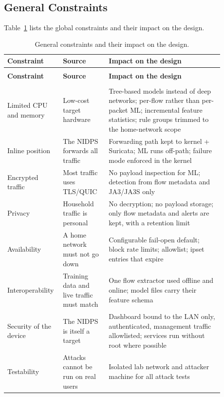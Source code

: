 \subsection{General Constraints}\label{sec:6.2.2}
\label{sec:constraints}
\noindent Table~\ref{tab:constraints} lists the global constraints and their impact on the design.

\begin{longtable}{|>{\raggedright\arraybackslash}p{0.18\linewidth}|>{\raggedright\arraybackslash}p{0.2\linewidth}|>{\raggedright\arraybackslash}p{0.5\linewidth}|}
\caption{General constraints and their impact on the design.}
\label{tab:constraints} \\
\hline
\textbf{Constraint} & \textbf{Source} & \textbf{Impact on the design} \\
\hline
\endfirsthead
\multicolumn{3}{l}{\tablename\ \thetable{} -- continued from previous page} \\
\hline
\textbf{Constraint} & \textbf{Source} & \textbf{Impact on the design} \\
\hline
\endhead
\hline
\multicolumn{3}{r}{Continued on next page} \\
\endfoot
\hline
\endlastfoot
Limited CPU and memory & Low-cost target hardware & Tree-based models instead of deep networks; per-flow rather than per-packet ML; incremental feature statistics; rule groups trimmed to the home-network scope \\
\hline
Inline position & The NIDPS forwards all traffic & Forwarding path kept to kernel + Suricata; ML runs off-path; failure mode enforced in the kernel \\
\hline
Encrypted traffic & Most traffic uses TLS/QUIC & No payload inspection for ML; detection from flow metadata and JA3/JA3S only \\
\hline
Privacy & Household traffic is personal & No decryption; no payload storage; only flow metadata and alerts are kept, with a retention limit \\
\hline
Availability & A home network must not go down & Configurable fail-open default; block rate limits; allowlist; ipset entries that expire \\
\hline
Interoperability & Training data and live traffic must match & One flow extractor used offline and online; model files carry their feature schema \\
\hline
Security of the device & The NIDPS is itself a target & Dashboard bound to the LAN only, authenticated, management traffic allowlisted; services run without root where possible \\
\hline
Testability & Attacks cannot be run on real users & Isolated lab network and attacker machine for all attack tests \\
\hline
\end{longtable}

